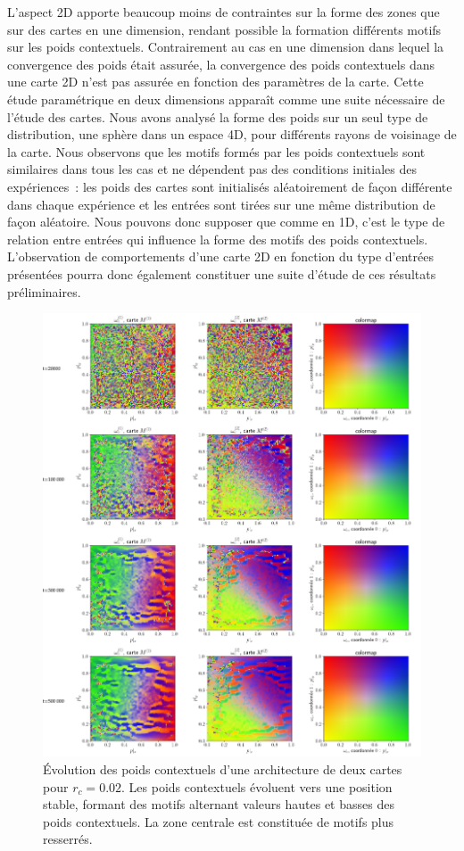 \documentclass[../main]{subfiles}
\begin{document}
L'aspect 2D apporte beaucoup moins de contraintes sur la forme des zones que sur des cartes en une dimension, rendant possible la formation différents motifs sur les poids contextuels. 
Contrairement au cas en une dimension dans lequel la convergence des poids était assurée, la convergence des poids contextuels dans une carte 2D n'est pas assurée en fonction des paramètres de la carte. Cette étude paramétrique en deux dimensions apparaît comme une suite nécessaire de l'étude des cartes.
Nous avons analysé la forme des poids sur un seul type de distribution, une sphère dans un espace 4D, pour différents rayons de voisinage de la carte. 
Nous observons que les motifs formés par les poids contextuels sont similaires dans tous les cas et ne dépendent pas des conditions initiales des expériences~: les poids des cartes sont initialisés aléatoirement de façon différente dans chaque expérience et les entrées sont tirées sur une même distribution de façon aléatoire.
Nous pouvons donc supposer que comme en 1D, c'est le type de relation entre entrées qui influence la forme des motifs des poids contextuels. L'observation de comportements d'une carte 2D en fonction du type d'entrées présentées pourra donc également constituer une suite d'étude de ces résultats préliminaires.

\begin{figure}[p]
	\includegraphics[width=\textwidth]{2SOM_sphere_rc002_evol.pdf}
	\caption{\'Evolution des poids contextuels d'une architecture de deux cartes pour $r_c =0.02$. Les poids contextuels évoluent vers une position stable, formant des motifs alternant valeurs hautes et basses des poids contextuels. La zone centrale est constituée de motifs plus resserrés. \label{fig:rc_002}}
\end{figure}
\end{document}
